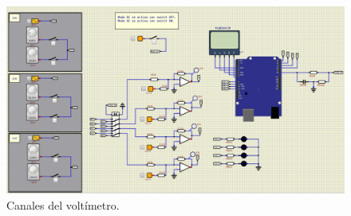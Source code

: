 \begin{figure}[H]
\centering
\includegraphics[width=.8\linewidth]{Imagenes/7.png}
 \caption{Canales del voltímetro.}
 \label{fig7}
\end{figure}


























\newpage
